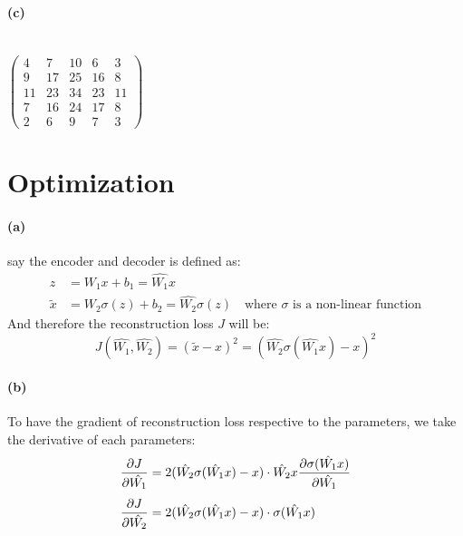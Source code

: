 \documentclass{article}
\begin{document}
\paragraph{(c)} \\
$\begin{pmatrix}
  4 & 7 & 10 & 6 & 3 \\[0.4em]
  9 & 17 & 25 & 16 & 8 \\[0.4em]
  11 & 23 & 34 & 23 & 11 \\[0.4em]
  7 & 16 & 24 & 17 & 8 \\[0.4em]
  2 & 6 & 9 &7 & 3
\end{pmatrix}$ \\


\section{Optimization}
\paragraph{(a)} say the encoder and decoder is defined as:
\begin{equation}
\begin{align}
z &= W_1x + b_1 = \hat{W_1}x \\[0.4em]
\tilde{x} &= W_2\sigma(z) + b_2 = \hat{W_2}\sigma(z)  \quad \text{where $\sigma$ is a non-linear function}
\end{align}
\end{equation}
And therefore the reconstruction loss $J$ will be:
\begin{equation}
J(\hat{W_1}, \hat{W_2}) = (\tilde{x}-x)^2 = (\hat{W_2}\sigma(\hat{W_1}x)-x)^2
\end{equation}

\paragraph{(b)} To have the gradient of reconstruction loss respective to the parameters, we take the derivative of each parameters:
\begin{equation}
\begin{align}
{\partial J \over \partial \hat{W_1}} &= 2(\hat{W_2}\sigma(\hat{W_1}x)-x) \cdot \hat{W_2}x{\partial \sigma(\hat{W_1}x)\over \partial \hat{W_1}} \\[0.4em]
{\partial J \over \partial \hat{W_2}} &= 2(\hat{W_2}\sigma(\hat{W_1}x)-x) \cdot \sigma(\hat{W_1}x)
\end{align}
\end{equation}
\end{document}
